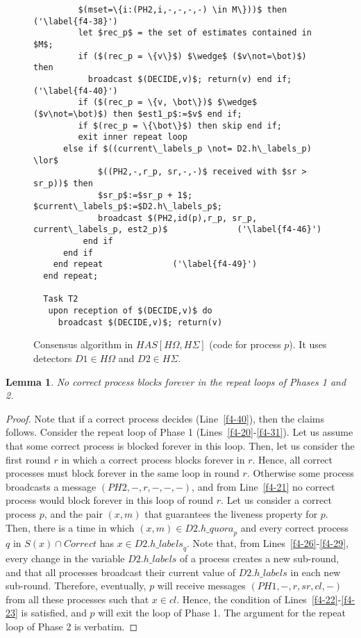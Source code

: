 \documentclass[10pt, conference, compsocconf]{IEEEtran}
\newtheorem{lemma}{Lemma}
\newcommand{\HO}{{H\Omega}}
\newcommand{\HS}{{H\Sigma}}
\newcommand{\C}{{\mathit{Correct}}}
\newcommand{\quora}{{\mathit{h\_quora}}}
\newcommand{\labels}{{\mathit{h\_labels}}}
\begin{document}
\begin{figure}
\begin{lstlisting}
         $(mset=\{i:(PH2,i,-,-,-,-) \in M\}))$ then             ('\label{f4-38}')
         let $rec_p$ = the set of estimates contained in $M$;
         if ($(rec_p = \{v\}$) $\wedge$ ($v\not=\bot)$) then 
           broadcast $(DECIDE,v)$; return(v) end if;             ('\label{f4-40}')
         if ($(rec_p = \{v, \bot\})$ $\wedge$ ($v\not=\bot)$) then $est1_p$:=$v$ end if;
         if $(rec_p = \{\bot\}$) then skip end if;
         exit inner repeat loop
      else if $((current\_labels_p \not= D2.h\_labels_p) \lor$
             $((PH2,-,r_p, sr,-,-)$ received with $sr > sr_p))$ then
             $sr_p$:=$sr_p + 1$; $current\_labels_p$:=$D2.h\_labels_p$; 
             broadcast $(PH2,id(p),r_p, sr_p, current\_labels_p, est2_p)$              ('\label{f4-46}')
          end if
      end if
    end repeat              ('\label{f4-49}')
  end repeat;
     
  Task T2
   upon reception of $(DECIDE,v)$ do 
     broadcast $(DECIDE,v)$; return(v)
\end{lstlisting}
\caption{Consensus algorithm in $\mathit{HAS}[\HO,\HS]$ (code for process $p$). It uses detectors $D1 \in \HO$ and $D2 \in \HS$.}
\label{Fig-Cons-HO-Sigma}
\end{figure}    

\begin{lemma}
\label{no-block-repeats}
No correct process blocks forever in the repeat loops of Phases 1 and 2.
\end{lemma}
\begin{proof}
Note that if a correct  process decides (Line~\ref{f4-40}), then the claims
follows.  
Consider the repeat loop of Phase 1 (Lines~\ref{f4-20}-\ref{f4-31}). Let us
assume that some correct process is blocked forever in  
this loop.  Then, let us  consider the first  round $r$ in which  a correct
process  blocks forever  in $r$.  Hence, all  correct processes  must block
forever in the same loop in  round $r$. Otherwise some process broadcasts a
message  
$(PH2,-,r,-,-,-)$, and from Line~\ref{f4-21} no correct process would block
forever in this loop of round $r$. 
Let us consider a correct process $p$, and the pair $(x,m)$ that guarantees
the liveness property for $p$. Then, there 
is a time in which $(x,m) \in D2.\quora_p$ and every correct process $q$ in
$S(x) \cap \C$ has $x \in D2.\labels_q$. 
Note that, from Lines~\ref{f4-26}-\ref{f4-29}, every change in the variable
$D2.\labels$ of  a process creates a  new sub-round, and  that all processes
broadcast   their    current   value   of   $D2.\labels$    in   each   new
sub-round. Therefore,  
eventually, $p$  will receive  messages $(PH1,-,r,sr,cl,-)$ from  all these
processes   such    that   $x   \in   cl$.   Hence,    the   condition   of
Lines~\ref{f4-22}-\ref{f4-23} is  satisfied, and $p$ will exit  the loop of
Phase 1. The argument for the repeat loop of  
Phase 2 is verbatim.
\end{proof}
\end{document}
